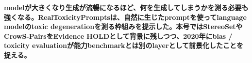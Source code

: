 \noindent\textbf{modelが大きくなり生成が流暢になるほど、何を生成してしまうかを測る必要も強くなる。RealToxicityPromptsは、自然に生じたpromptを使ってlanguage modelのtoxic degenerationを測る枠組みを提示した。本号ではStereoSetやCrowS-PairsをEvidence HOLDとして背景に残しつつ、2020年にbias / toxicity evaluationが能力benchmarkとは別のlayerとして前景化したことを捉える。}\autocite{src-308178e74f55}

